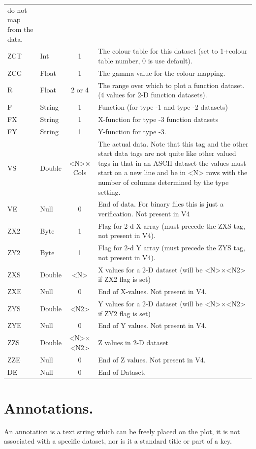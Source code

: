\documentclass[english]{article}
\begin{document}
\begin{longtable}{|llcp{8cm}|}
  do not map from the data.\\
  ZCT & Int & 1 & The colour table for this dataset (set to 1+colour
  table number, 0 is use default).\\
  ZCG & Float & 1 & The gamma value for the colour mapping.\\
  R& Float& 2 or 4& The range over which to plot a function dataset. (4
  values for 2-D
  function datasets).\\
  F& String& 1&
  Function (for type -1 and type -2 datasets)\\
  FX& String& 1&
  X-function for type -3 function datasets\\
  FY& String& 1&
  Y-function for type -3.\\
  VS& Double& <N>$\times$Cols& The actual data. Note that this tag and
  the other start data tags are not quite like other valued tags in that
  in an ASCII dataset the values must start on a new line and be in <N>
  rows with the number of columns
  determined by the type setting.\\
  VE& Null& 0&
  End of data. For binary files this is just a verification. Not
  present in V4\\
  ZX2 & Byte & 1 & Flag for 2-d X array (must precede the ZXS tag, not
  present in V4).\\
  ZY2 & Byte & 1 & Flag for 2-d Y array (must precede the ZYS tag, not
  present in V4).\\
  ZXS& Double& <N>&
  X values for a 2-D dataset (will be <N>$\times$<N2> if ZX2 flag is set) \\
  ZXE& Null& 0&
  End of X-values. Not present in V4.\\
  ZYS& Double& <N2>&
  Y values for a 2-D dataset (will be <N>$\times$<N2> if ZY2 flag is set)\\
  ZYE& Null& 0&
  End of Y values. Not present in V4.\\
  ZZS& Double& <N>$\times$<N2>&
  Z values in 2-D dataset\\
  ZZE& Null& 0&
  End of Z values. Not present in V4.\\
  DE& Null& 0&
  End of Dataset.\\
\end{longtable}


\section{Annotations.}

An annotation is a text string which can be freely placed on the plot,
it is not associated with a specific dataset, nor is it a standard
title or part of a key.
\end{document}
